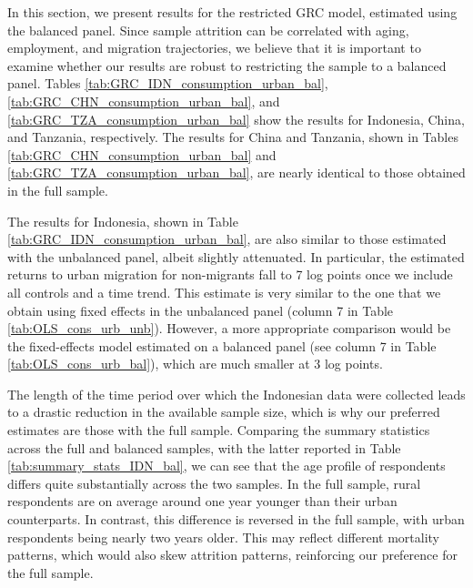 \documentclass[12pt]{article}
\begin{document}


In this section, we present results for the restricted GRC model, estimated using the balanced panel. 
Since sample attrition can be correlated with aging, employment, and migration trajectories, we believe that it is important to examine whether our results are robust to restricting the sample to a balanced panel.
Tables \ref{tab:GRC_IDN_consumption_urban_bal}, \ref{tab:GRC_CHN_consumption_urban_bal}, and \ref{tab:GRC_TZA_consumption_urban_bal}  show the results for Indonesia, China, and Tanzania, respectively.
The results for China and Tanzania, shown in Tables \ref{tab:GRC_CHN_consumption_urban_bal} and \ref{tab:GRC_TZA_consumption_urban_bal}, are nearly identical to those obtained in the full sample.

 
 
 

The results for Indonesia, shown in Table \ref{tab:GRC_IDN_consumption_urban_bal}, are also similar to those estimated with the unbalanced panel, albeit slightly attenuated. 
In particular, the estimated returns to urban migration for non-migrants fall to 7 log points once we include all controls and a time trend. 
This estimate is very similar to the one that we obtain using fixed effects in the unbalanced panel (column 7 in Table \ref{tab:OLS_cons_urb_unb}). 
However, a more appropriate comparison would be the fixed-effects model estimated on a balanced panel (see column 7 in Table \ref{tab:OLS_cons_urb_bal}), which are much smaller at 3 log points. 

The length of the time period over which the Indonesian data were collected leads to a drastic reduction in the available sample size, which is why our preferred estimates are those with the full sample. 
Comparing the summary statistics across the full and balanced samples, with the latter reported in Table \ref{tab:summary_stats_IDN_bal}, we can see that the age profile of respondents differs quite substantially across the two samples.
In the full sample, rural respondents are on average around one year younger than their urban counterparts. 
In contrast, this difference is reversed in the full sample, with urban respondents being nearly two years older. 
This may reflect different mortality patterns, which would also skew attrition patterns, reinforcing our preference for the full sample. 
\end{document}
